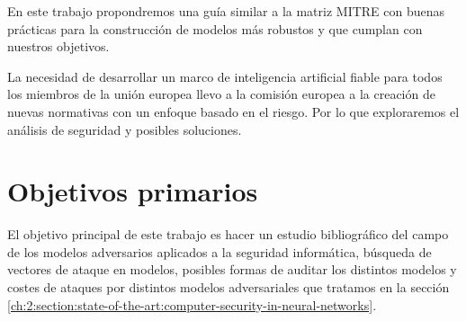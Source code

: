 En este trabajo propondremos una guía similar a la matriz \gls{MITRE} con buenas prácticas para la construcción de modelos más robustos y que cumplan con nuestros objetivos.

La necesidad de desarrollar un marco de inteligencia artificial fiable para todos los miembros de la unión europea llevo a la comisión europea a la creación de nuevas normativas con un enfoque basado en el riesgo.
Por lo que exploraremos el análisis de seguridad y posibles soluciones.


\section{Objetivos primarios}



El objetivo principal de este trabajo es hacer un estudio bibliográfico del campo de los modelos adversarios aplicados a la seguridad informática, búsqueda de vectores de ataque en modelos, posibles formas de auditar los distintos modelos y costes de ataques por distintos modelos adversariales que tratamos en la sección \ref{ch:2:section:state-of-the-art:computer-security-in-neural-networks}.

